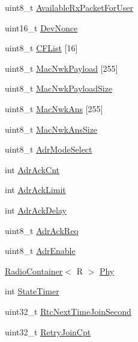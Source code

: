 \begin{DoxyCompactItemize}
uint8\+\_\+t \mbox{\hyperlink{class_lora_wan_container_a736200328d8ff1538edfed3293e02ca9}{Available\+Rx\+Packet\+For\+User}}
\item 
uint16\+\_\+t \mbox{\hyperlink{class_lora_wan_container_a690b98b15d06ffcd16dc09aeacba25fc}{Dev\+Nonce}}
\item 
uint8\+\_\+t \mbox{\hyperlink{class_lora_wan_container_ad1d51b822467332f07b94fcb17189ced}{C\+F\+List}} \mbox{[}16\mbox{]}
\item 
uint8\+\_\+t \mbox{\hyperlink{class_lora_wan_container_a1aa41109a8f67940d645666709a3c12b}{Mac\+Nwk\+Payload}} \mbox{[}255\mbox{]}
\item 
uint8\+\_\+t \mbox{\hyperlink{class_lora_wan_container_aecdf27c0dbb1e17533574ed76ec62e49}{Mac\+Nwk\+Payload\+Size}}
\item 
uint8\+\_\+t \mbox{\hyperlink{class_lora_wan_container_ac1ae71177292139650127c17088a6337}{Mac\+Nwk\+Ans}} \mbox{[}255\mbox{]}
\item 
uint8\+\_\+t \mbox{\hyperlink{class_lora_wan_container_a76713cb99312f54ec3bf3057c2a0e798}{Mac\+Nwk\+Ans\+Size}}
\item 
uint8\+\_\+t \mbox{\hyperlink{class_lora_wan_container_a020a7c766b4791fde846cc634f4ce577}{Adr\+Mode\+Select}}
\item 
int \mbox{\hyperlink{class_lora_wan_container_aa92da5fb24a992b90c3bf9b1c8974643}{Adr\+Ack\+Cnt}}
\item 
int \mbox{\hyperlink{class_lora_wan_container_a89d2412d983e7027ef346f55b6b1ecf2}{Adr\+Ack\+Limit}}
\item 
int \mbox{\hyperlink{class_lora_wan_container_a1106c7156c06f2f38ebb7abda72524bf}{Adr\+Ack\+Delay}}
\item 
uint8\+\_\+t \mbox{\hyperlink{class_lora_wan_container_a439b4f69a284db6eba911792a41c767a}{Adr\+Ack\+Req}}
\item 
uint8\+\_\+t \mbox{\hyperlink{class_lora_wan_container_a886dfe29c3f405f8fcd7943da9b5285f}{Adr\+Enable}}
\item 
\mbox{\hyperlink{class_radio_container}{Radio\+Container}}$<$ R $>$ \mbox{\hyperlink{class_lora_wan_container_a022c395b2c5a3829c14168a52a187a61}{Phy}}
\item 
int \mbox{\hyperlink{class_lora_wan_container_a1fd80f37a0842928631d917de271cfe9}{State\+Timer}}
\item 
uint32\+\_\+t \mbox{\hyperlink{class_lora_wan_container_a9b25f6e36173b50f63d594afe560d4d6}{Rtc\+Next\+Time\+Join\+Second}}
\item 
uint32\+\_\+t \mbox{\hyperlink{class_lora_wan_container_aaf9bed2385f02a1396f1e3bf68a71494}{Retry\+Join\+Cpt}}
\end{DoxyCompactItemize}
